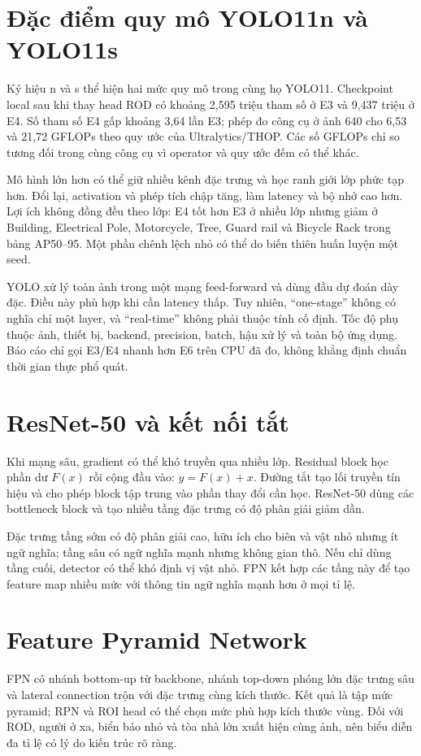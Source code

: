 \section{Đặc điểm quy mô YOLO11n và YOLO11s}
Ký hiệu n và s thể hiện hai mức quy mô trong cùng họ YOLO11. Checkpoint local sau khi thay head ROD có khoảng 2,595 triệu tham số ở E3 và 9,437 triệu ở E4. Số tham số E4 gấp khoảng 3,64 lần E3; phép đo công cụ ở ảnh 640 cho 6,53 và 21,72 GFLOPs theo quy ước của Ultralytics/THOP. Các số GFLOPs chỉ so tương đối trong cùng công cụ vì operator và quy ước đếm có thể khác.

Mô hình lớn hơn có thể giữ nhiều kênh đặc trưng và học ranh giới lớp phức tạp hơn. Đổi lại, activation và phép tích chập tăng, làm latency và bộ nhớ cao hơn. Lợi ích không đồng đều theo lớp: E4 tốt hơn E3 ở nhiều lớp nhưng giảm ở Building, Electrical Pole, Motorcycle, Tree, Guard rail và Bicycle Rack trong bảng AP50--95. Một phần chênh lệch nhỏ có thể do biến thiên huấn luyện một seed.

YOLO xử lý toàn ảnh trong một mạng feed-forward và dùng đầu dự đoán dày đặc. Điều này phù hợp khi cần latency thấp. Tuy nhiên, “one-stage” không có nghĩa chỉ một layer, và “real-time” không phải thuộc tính cố định. Tốc độ phụ thuộc ảnh, thiết bị, backend, precision, batch, hậu xử lý và toàn bộ ứng dụng. Báo cáo chỉ gọi E3/E4 nhanh hơn E6 trên CPU đã đo, không khẳng định chuẩn thời gian thực phổ quát.

\section{ResNet-50 và kết nối tắt}
Khi mạng sâu, gradient có thể khó truyền qua nhiều lớp. Residual block học phần dư $F(x)$ rồi cộng đầu vào: $y=F(x)+x$. Đường tắt tạo lối truyền tín hiệu và cho phép block tập trung vào phần thay đổi cần học. ResNet-50 dùng các bottleneck block và tạo nhiều tầng đặc trưng có độ phân giải giảm dần.

Đặc trưng tầng sớm có độ phân giải cao, hữu ích cho biên và vật nhỏ nhưng ít ngữ nghĩa; tầng sâu có ngữ nghĩa mạnh nhưng không gian thô. Nếu chỉ dùng tầng cuối, detector có thể khó định vị vật nhỏ. FPN kết hợp các tầng này để tạo feature map nhiều mức với thông tin ngữ nghĩa mạnh hơn ở mọi tỉ lệ.

\section{Feature Pyramid Network}
FPN có nhánh bottom-up từ backbone, nhánh top-down phóng lớn đặc trưng sâu và lateral connection trộn với đặc trưng cùng kích thước. Kết quả là tập mức pyramid; RPN và ROI head có thể chọn mức phù hợp kích thước vùng. Đối với ROD, người ở xa, biển báo nhỏ và tòa nhà lớn xuất hiện cùng ảnh, nên biểu diễn đa tỉ lệ có lý do kiến trúc rõ ràng.

